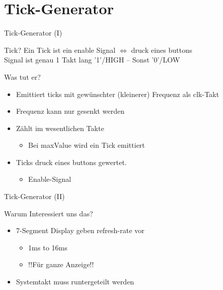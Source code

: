 
  \section{Tick-Generator}
  \begin{frame} {Tick-Generator (I)}
    \begin{exampleblock} {Tick?}
      Ein Tick ist ein enable Signal $\Leftrightarrow$ druck eines buttons\\
      Signal ist genau 1 Takt lang '1'/HIGH -- Sonst '0'/LOW
    \end{exampleblock}
    \begin{block} {Was tut er?}
      \begin{itemize}
        \item Emittiert ticks mit gewünschter (kleinerer) Frequenz als clk-Takt
        \item Frequenz kann nur gesenkt werden
        \item Zählt im wesentlichen Takte
        \begin{itemize}
          \item Bei maxValue wird ein Tick emittiert
        \end{itemize}
        \item Ticks druck eines buttons gewertet.
        \begin{itemize}
          \item Enable-Signal 
        \end{itemize}
      \end{itemize}
    \end{block}
  \end{frame}

  \begin{frame} {Tick-Generator (II)}
    \begin{block} {Warum Interessiert uns das?}
      \begin{itemize}
        \item 7-Segment Display geben refresh-rate vor
        \begin{itemize}
          \item 1ms to 16ms
          \item !!Für ganze Anzeige!!
        \end{itemize}
        \item Systemtakt muss runtergeteilt werden
      \end{itemize}
    \end{block}
  \end{frame}

